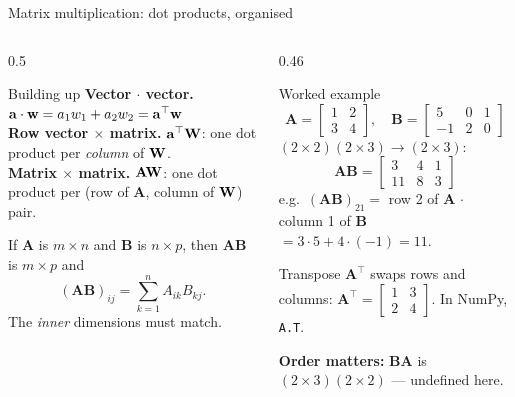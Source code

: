 \documentclass[aspectratio=169,10pt]{beamer}
\begin{document}
\begin{frame}{Matrix multiplication: dot products, organised}
  \begin{columns}[T,onlytextwidth]
    \begin{column}{0.5\textwidth}
      \begin{block}{Building up}
        \footnotesize
        \textbf{Vector $\cdot$ vector.}
        $\mathbf{a}\cdot\mathbf{w} = a_1w_1+a_2w_2 = \mathbf{a}^{\top}\mathbf{w}$\\[2pt]
        \textbf{Row vector $\times$ matrix.} $\mathbf{a}^{\top}\mathbf{W}$: one dot product per
        \emph{column} of $\mathbf{W}$.\\[2pt]
        \textbf{Matrix $\times$ matrix.} $\mathbf{A}\mathbf{W}$: one dot product per (row of
        $\mathbf{A}$, column of $\mathbf{W}$) pair.
      \end{block}
      \begin{defnbox}[Rule]
        \small
        If $\mathbf{A}$ is $m\times n$ and $\mathbf{B}$ is $n\times p$, then $\mathbf{AB}$ is
        $m\times p$ and
        \[ (\mathbf{AB})_{ij} = \sum_{k=1}^{n} A_{ik}B_{kj}. \]
        The \emph{inner} dimensions must match.
      \end{defnbox}
    \end{column}
    \begin{column}{0.46\textwidth}
      \footnotesize
      \begin{block}{Worked example}
        \[ \mathbf{A}=\begin{bmatrix}1&2\\3&4\end{bmatrix},\quad
           \mathbf{B}=\begin{bmatrix}5&0&1\\-1&2&0\end{bmatrix} \]
        $(2\times2)(2\times3)\to(2\times3)$:
        \[ \mathbf{AB}=\begin{bmatrix}3&4&1\\11&8&3\end{bmatrix} \]
        e.g.\ $(\mathbf{AB})_{21}=$ row 2 of $\mathbf{A}$ $\cdot$ column 1 of $\mathbf{B}$
        $=3\cdot5+4\cdot(-1)=11$.
      \end{block}
      \begin{block}{Transpose}
        $\mathbf{A}^{\top}$ swaps rows and columns:
        $\mathbf{A}^{\top}=\begin{bmatrix}1&3\\2&4\end{bmatrix}$.
        In NumPy, \texttt{A.T}.
      \end{block}
      \textbf{Order matters:} $\mathbf{BA}$ is $(2\times3)(2\times2)$ --- undefined here.
    \end{column}
  \end{columns}
\end{frame}
\end{document}
